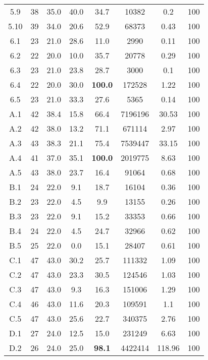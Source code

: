 \begin{longtable}{@{\extracolsep{5pt}}cccccccc}
	5.9 &
		38 & 35.0 &
			40.0
		&
			34.7
		& 10382 & 0.2 & 100
	\\
	5.10 &
		39 & 34.0 &
			20.6
		&
			52.9
		& 68373 & 0.43 & 100
	\\
	6.1 &
		23 & 21.0 &
			28.6
		&
			11.0
		& 2990 & 0.11 & 100
	\\
	6.2 &
		22 & 20.0 &
			10.0
		&
			35.7
		& 20778 & 0.29 & 100
	\\
	6.3 &
		23 & 21.0 &
			23.8
		&
			28.7
		& 3000 & 0.1 & 100
	\\
	6.4 &
		22 & 20.0 &
			30.0
		&
			\textbf{100.0}
		& 172528 & 1.22 & 100
	\\
	6.5 &
		23 & 21.0 &
			33.3
		&
			27.6
		& 5365 & 0.14 & 100
	\\
	A.1 &
		42 & 38.4 &
			15.8
		&
			66.4
		& 7196196 & 30.53 & 100
	\\
	A.2 &
		42 & 38.0 &
			13.2
		&
			71.1
		& 671114 & 2.97 & 100
	\\
	A.3 &
		43 & 38.3 &
			21.1
		&
			75.4
		& 7539447 & 33.15 & 100
	\\
	A.4 &
		41 & 37.0 &
			35.1
		&
			\textbf{100.0}
		& 2019775 & 8.63 & 100
	\\
	A.5 &
		43 & 38.0 &
			23.7
		&
			16.4
		& 91064 & 0.68 & 100
	\\
	B.1 &
		24 & 22.0 &
			9.1
		&
			18.7
		& 16104 & 0.36 & 100
	\\
	B.2 &
		23 & 22.0 &
			4.5
		&
			9.9
		& 13155 & 0.26 & 100
	\\
	B.3 &
		23 & 22.0 &
			9.1
		&
			15.2
		& 33353 & 0.66 & 100
	\\
	B.4 &
		24 & 22.0 &
			4.5
		&
			24.7
		& 32966 & 0.62 & 100
	\\
	B.5 &
		25 & 22.0 &
			0.0
		&
			15.1
		& 28407 & 0.61 & 100
	\\
	C.1 &
		47 & 43.0 &
			30.2
		&
			25.7
		& 111332 & 1.09 & 100
	\\
	C.2 &
		47 & 43.0 &
			23.3
		&
			30.5
		& 124546 & 1.03 & 100
	\\
	C.3 &
		47 & 43.0 &
			9.3
		&
			16.3
		& 151006 & 1.29 & 100
	\\
	C.4 &
		46 & 43.0 &
			11.6
		&
			20.3
		& 109591 & 1.1 & 100
	\\
	C.5 &
		47 & 43.0 &
			25.6
		&
			22.7
		& 340375 & 2.76 & 100
	\\
	D.1 &
		27 & 24.0 &
			12.5
		&
			15.0
		& 231249 & 6.63 & 100
	\\
	D.2 &
		26 & 24.0 &
			25.0
		&
			\textbf{98.1}
		& 4422414 & 118.96 & 100
	\\

\end{longtable}

